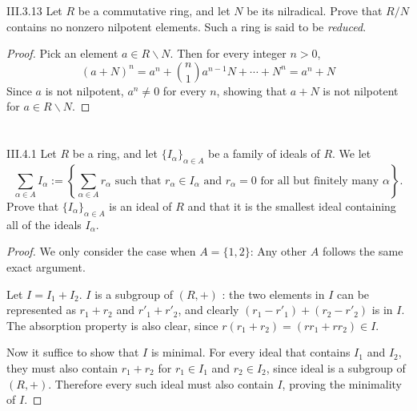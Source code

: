 \begin{problem}{III.3.13}
Let $R$ be a commutative ring, and let $N$ be its nilradical. Prove that $R/N$ contains no nonzero nilpotent elements. Such a ring is said to be \emph{reduced}.
\end{problem}
\begin{proof}
Pick an element $a \in R \backslash N$. Then for every integer $n > 0$, 
\[
(a + N)^n = a^n + \binom{n}{1} a^{n-1} N + \cdots + N^n = a^n + N
\]
Since $a$ is not nilpotent, $a^n \neq 0$ for every $n$, showing that $a + N$ is not nilpotent for $a \in R \backslash N$.
\end{proof}

\section{}
\begin{problem}{III.4.1}
Let $R$ be a ring, and let $\{I_\alpha\}_{\alpha \in A}$ be a family of ideals of $R$. We let 
\[
\sum_{\alpha \in A} I_\alpha := \left\{ \sum_{\alpha \in A}r_\alpha \text{ such that } r_\alpha \in I_\alpha \text{ and } r_\alpha = 0 \text{ for all but finitely many } \alpha \right\}.  
\]
Prove that $\{I_\alpha\}_{\alpha \in A}$ is an ideal of $R$ and that it is the smallest ideal containing all of the ideals $I_\alpha$.
\end{problem}
\begin{proof}
We only consider the case when $A = \{1,2\}$: Any other $A$ follows the same exact argument. 

Let $I = I_1 + I_2$. $I$ is a subgroup of $(R,+)$ : the two elements in $I$ can be represented as $r_1 + r_2$ and $r'_1 + r'_2$, and clearly $(r_1 - r'_1) + (r_2 - r'_2)$ is in $I$. The absorption property is also clear, since $r (r_1 + r_2) = (rr_1 + rr_2) \in I$. 

Now it suffice to show that $I$ is minimal. For every ideal that contains $I_1$ and $I_2$, they must also contain $r_1 + r_2$ for $r_1 \in I_1$ and $r_2 \in I_2$, since ideal is a subgroup of $(R,+)$. Therefore every such ideal must also contain $I$, proving the minimality of $I$.
\end{proof}

